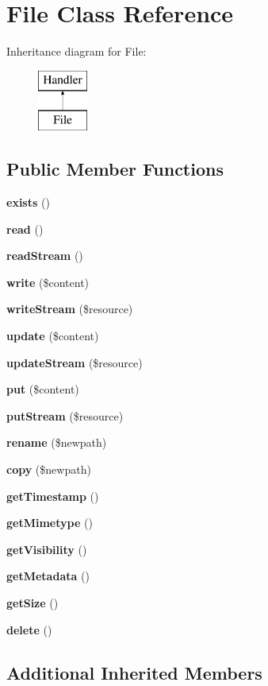 \section{File Class Reference}
\label{class_league_1_1_flysystem_1_1_file}
Inheritance diagram for File\+:\begin{figure}[H]
\begin{center}
\leavevmode
\includegraphics[height=2.000000cm]{class_league_1_1_flysystem_1_1_file}
\end{center}
\end{figure}
\subsection*{Public Member Functions}
\begin{DoxyCompactItemize}
\item 
{\bf exists} ()
\item 
{\bf read} ()
\item 
{\bf read\+Stream} ()
\item 
{\bf write} (\$content)
\item 
{\bf write\+Stream} (\$resource)
\item 
{\bf update} (\$content)
\item 
{\bf update\+Stream} (\$resource)
\item 
{\bf put} (\$content)
\item 
{\bf put\+Stream} (\$resource)
\item 
{\bf rename} (\$newpath)
\item 
{\bf copy} (\$newpath)
\item 
{\bf get\+Timestamp} ()
\item 
{\bf get\+Mimetype} ()
\item 
{\bf get\+Visibility} ()
\item 
{\bf get\+Metadata} ()
\item 
{\bf get\+Size} ()
\item 
{\bf delete} ()
\end{DoxyCompactItemize}
\subsection*{Additional Inherited Members}


